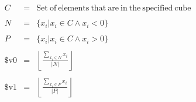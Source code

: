 \documentclass[psfig,11pt]{article}
\def\normalstretch{1.0}
\def\talllinestretch{1.8}
\renewcommand{\baselinestretch}{\normalstretch}
\newif\ifsol
\begin{document}
\renewcommand{\baselinestretch}{\talllinestretch}  
\ \\
\ \\
\renewcommand{\baselinestretch}{\normalstretch}

\newenvironment{question}[1][??]{\noindent{\bf Question  \stepcounter{quest}
\arabic{quest} (\textrm{#1} points): }}

\renewcommand{\theenumi}{}


\begin{eqnarray}
C &=& \mathrm{Set\ of\ elements\ that\ are\ in\ the\ specified\ cube} \nonumber \\
\nonumber\\
N &=& \{x_i | x_i \in C \wedge x_i < 0\} \nonumber \\
\nonumber\\
P &=& \{x_i | x_i \in C \wedge x_i > 0\} \nonumber \\
\nonumber\\
\mathrm{\$v0} &=& \left\lfloor \frac{ \sum_{ x_i \in N} x_i}{|N|} \right\rfloor \nonumber \\
\nonumber\\
\mathrm{\$v1} &=&  \left\lfloor \frac{ \sum_{ x_i \in P} x_i}{|P|} \right\rfloor \nonumber
\end{eqnarray}
\end{document}
